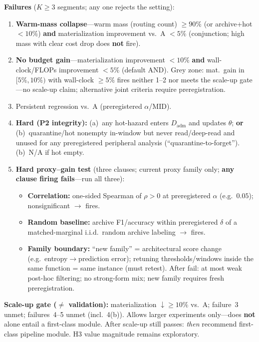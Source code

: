 \documentclass{article}
\begin{document}
\textbf{Failures} (\(K\geq 3\) segments; any one rejects the setting):
\begin{enumerate}[label=\arabic*.]
\item \textbf{Warm-mass collapse}---warm mass (routing count) \(\geq 90\%\) (or archive+hot \(<10\%\)) \textbf{and} materialization improvement vs.\ A \(<5\%\) (conjunction; high mass with clear cost drop does \textbf{not} fire).
\item \textbf{No budget gain}---materialization improvement \(<10\%\) \textbf{and} wall-clock/FLOPs improvement \(<5\%\) (default AND). Grey zone: mat.\ gain in \([5\%,10\%)\) with wall-clock \(\geq 5\%\) fires neither 1--2 nor meets the scale-up gate---no scale-up claim; alternative joint criteria require preregistration.
\item Persistent regression vs.\ A (preregistered \(\alpha\)/MID).
\item \textbf{Hard (P2 integrity):} (a)~any hot-hazard enters \(D_{\mathrm{adm}}\) and updates \(\theta\); \textbf{or} (b)~quarantine/hot nonempty in-window but never read/deep-read and unused for any preregistered peripheral analysis (``quarantine-to-forget''). (b)~N/A if hot empty.
\item \textbf{Hard proxy--gain test} (three clauses; current proxy family only; \textbf{any clause firing fails}---run all three):
\begin{itemize}
\item \textbf{Correlation:} one-sided Spearman of \(\rho>0\) at preregistered \(\alpha\) (e.g.\ \(0.05\)); nonsignificant \(\rightarrow\) fires.
\item \textbf{Random baseline:} archive F1/accuracy within preregistered \(\delta\) of a matched-marginal i.i.d.\ random archive labeling \(\rightarrow\) fires.
\item \textbf{Family boundary:} ``new family'' = architectural score change (e.g.\ entropy\(\rightarrow\)prediction error); retuning thresholds/windows inside the same function = same instance (must retest). After fail: at most weak post-hoc filtering; no strong-form mix; new family requires fresh preregistration.
\end{itemize}
\end{enumerate}

\textbf{Scale-up gate (\(\neq\) validation):} materialization \(\downarrow\geq 10\%\) vs.\ A; failure~3 unmet; failures~4--5 unmet (incl.\ 4(b)). Allows larger experiments only---does \textbf{not} alone entail a first-class module. After scale-up still passes: \emph{then} recommend first-class pipeline module. H3 value magnitude remains exploratory.
\end{document}

